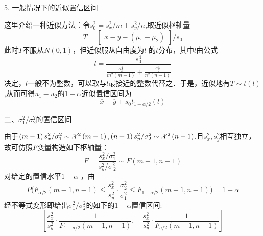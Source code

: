 5. 一般情况下的近似置信区间

这里介绍一种近似方法：令$s_{0}^{2}=s_{x}^{2}/m+s_{y}^{2}/n$,取近似枢轴量
$$
    T=\left[\begin{array}{cc}\overline{x}-\overline{y}-(\mu_1-\mu_2)\end{array}\right]/s_0
$$
此时$T$不服从$N(0,1)$，但近似服从自由度为$l$ 的$t$分布，其中$l$由公式
$$
    l=\frac{s_0^4}{\frac{s_x^4}{m^2(m-1)}+\frac{s_y^4}{n^2(n-1)}}
$$
决定，$l$一般不为整数，可以取与$l$最接近的整数代替之．于是，近似地有$T \sim t(l) $,从而可得$u_1-u_2$的$1-\alpha$近似置信区间为
$$
    \overline{x}-\overline{y}\pm s_0t_{1-\alpha/2}(l)
$$

二、$\sigma_1^2/\sigma_2^2$的置信区间

由于$\left(m-1\right)s_{x}^{2}/\sigma_{1}^{2}\sim{\cal X}^{2}\left(m-1\right),\left(n-1\right)s_{y}^{2}/\sigma_{2}^{2}\sim{\cal X}^{2}\left(n-1\right)$,且$s_x^2,s_y^2$相互独立，故可仿照$F$变量构造如下枢轴量：
$$
    F=\frac{s_{x}^{2}/\sigma_{1}^{2}}{s_{y}^{2}/\sigma_{~2}^{2}}\sim F(m-1,n-1)
$$
对给定的置信水平$1-\alpha$ ，由
$$
    P\Bigg(F_{\alpha/2}(m-1,n-1)\leqslant\frac{s_{x}^{2}}{s_{y}^{2}}\cdot\frac{\sigma_{2}^{2}}{\sigma_{1}^{2}}\le F_{1-\alpha/2}(m-1,n-1)\Bigg)=1-\alpha
$$
经不等式变形即给出$\sigma_1^2/\sigma_2^2$的如下的$1-\alpha$置信区间:
$$
    \left[\frac{s_{x}^{2}}{s_{y}^{2}}\cdot\frac{1}{F_{1-a/2}(m-1,n-1)},\quad\frac{s_{x}^{2}}{s_{y}^{2}}\cdot\frac{1}{F_{a/2}(m-1,n-1)}\right]
$$